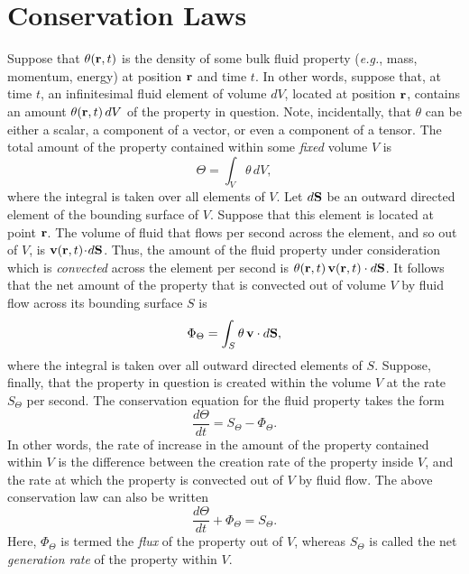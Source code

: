 \section{Conservation Laws} 
Suppose that $\theta({\bf r}, t)$ is the density of some bulk fluid property ({\em e.g.},  mass, momentum, 
energy) at position ${\bf r}$ and time $t$. In other words, suppose that, at time $t$,  an infinitesimal fluid element of volume $dV$, located
at position ${\bf r}$, contains an amount $\theta({\bf r},t)\,dV$ of the property in question. Note, incidentally,
that $\theta$ can be either a scalar, a component of a vector, or even a component of a tensor.
 The total 
amount of the property contained within some {\em fixed}\/ volume $V$ is
\begin{equation}
\Theta = \int_V \theta\,dV,
\end{equation}
where the integral is taken over all elements of $V$. Let $d{\bf S}$ be an outward directed 
element of the bounding surface of $V$. Suppose that this element is located at point ${\bf r}$. The volume of fluid  that
flows per second across the element, and so out of  $V$,  is ${\bf v}({\bf r}, t)\!\cdot\! d{\bf S}$. Thus, the
amount of the fluid property under consideration which is {\em convected}\/ across the element per second is
$\theta({\bf r},t)\,{\bf v}({\bf r}, t)\cdot d{\bf S}$. It follows that the net amount of the property that 
is convected out of volume $V$ by fluid flow across its bounding surface $S$ is
\begin{equation}\label{eflux}
\Phi_\Theta = \int_S \theta\,{\bf v}\cdot d{\bf S},
\end{equation}
where the integral is taken over all outward directed  elements of $S$. Suppose, finally, that
the property in question   is created within the volume $V$ at the rate $S_\Theta$ per second. 
The conservation equation for the fluid property takes the form
\begin{equation}
\frac{d\Theta}{dt} = S_\Theta-\Phi_\Theta.
\end{equation}
In other words, the rate of increase in the amount of the property contained within $V$ is the
difference between the  creation rate of the property inside $V$, and the rate at
which the property is convected out of $V$ by  fluid flow.
The above conservation law can also be written
\begin{equation}\label{econs}
\frac{d\Theta}{dt} +\Phi_\Theta= S_\Theta.
\end{equation}
Here, $\Phi_\Theta$ is termed the {\em flux}\/ of the property out of $V$, whereas $S_\Theta$ 
is called the net {\em generation rate}\/ of the property within $V$. 

